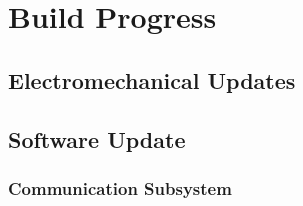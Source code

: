 
\section{Build Progress}
\label{sec:build_progress}


\subsection{Electromechanical Updates}
\label{sec:electromechanical_progress}


\subsection{Software Update}
\label{sec:software_progress}

\subsubsection{Communication Subsystem}
\label{sec:progress_comm_sys}


